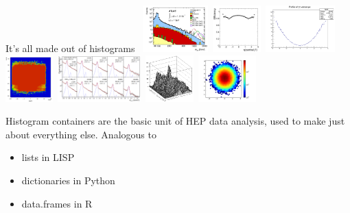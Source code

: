 \documentclass[aspectratio=169]{beamer}
\begin{document}
\begin{frame}{It's all made out of histograms}
\vspace{0.5 cm}
\mbox{\hspace{-1.1 cm}
\includegraphics[height=1.8cm]{dileptons_fig_01b_mumu.png}
\includegraphics[height=1.8cm]{efficiency.png}
\includegraphics[height=1.8cm]{profile_plot.png}
\includegraphics[height=1.8cm]{efficiency_2d.png}
\includegraphics[height=1.8cm]{histograms_of_histograms.png}
\includegraphics[height=1.8cm]{lego_plot.png}
\includegraphics[height=1.8cm]{two_dimensional.png}}

\vspace{0.5 cm}
\begin{center}
\begin{minipage}{0.9\linewidth}
\Large Histogram containers are the basic unit of HEP data analysis, used to make just about everything else. Analogous to

\vspace{0.5 cm}
\hspace{0.5 cm}\begin{minipage}{0.5\linewidth}
\begin{itemize}
\item lists in LISP
\item dictionaries in Python
\item data.frames in R
\end{itemize}
\end{minipage}
\end{minipage}
\end{center}
\end{frame}
\end{document}
